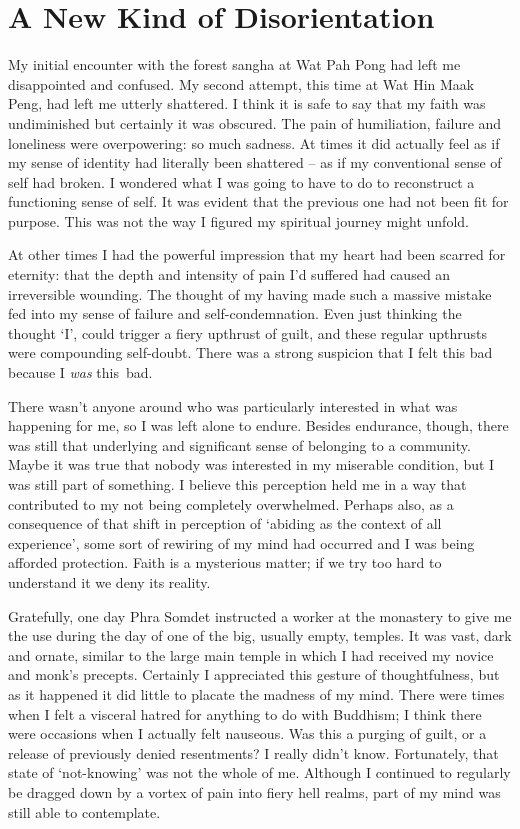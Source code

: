\chapter{A New Kind of Disorientation}

My initial encounter with the forest sangha at Wat Pah Pong had left me
disappointed and confused. My second attempt, this time at Wat Hin Maak Peng, had left me utterly shattered. I think it is safe to say that my faith was undiminished but
certainly it was obscured. The pain of humiliation, failure and
loneliness were overpowering: so much sadness. At times it did actually
feel as if my sense of identity had literally been shattered -- as if my
conventional sense of self had broken. I wondered what I was going to
have to do to reconstruct a functioning sense of self. It was evident
that the previous one had not been fit for purpose. This was not the way
I figured my spiritual journey might unfold.

\enlargethispage*{2\baselineskip}

At other times I had the powerful impression that my heart had been
scarred for eternity: that the depth and intensity of pain I'd suffered
had caused an irreversible wounding. The thought of my having made such
a massive mistake fed into my sense of failure and self-condemnation.
Even just thinking the thought `I', could trigger a fiery upthrust of
guilt, and these regular upthrusts were compounding \mbox{self-doubt}. There
was a strong suspicion that I felt this bad because I \emph{was} this~bad.

There wasn't anyone around who was particularly interested in what was
happening for me, so I was left alone to endure. Besides endurance,
though, there was still that underlying and significant sense of
belonging to a community. Maybe it was true that nobody was interested
in my miserable condition, but I was still part of something. I believe
this perception held me in a way that contributed to my not being
completely overwhelmed. Perhaps also, as a consequence of that shift in
perception of `abiding as the context of all experience', some sort of
rewiring of my mind had occurred and I was being afforded protection.
Faith is a mysterious matter; if we try too hard to understand it we
deny its reality.

Gratefully, one day Phra Somdet instructed a worker at the monastery to
give me the use during the day of one of the big, usually empty,
temples. It was vast, dark and ornate, similar to the large main temple
in which I had received my novice and monk's precepts. Certainly I
appreciated this gesture of thoughtfulness, but as it happened it did
little to placate the madness of my mind. There were times when I felt a
visceral hatred for anything to do with Buddhism; I think there were
occasions when I actually felt nauseous. Was this a purging of guilt, or
a release of previously denied resentments? I really didn't know.
Fortunately, that state of `not-knowing' was not the whole of me.
Although I continued to regularly be dragged down by a vortex of pain
into fiery hell realms, part of my mind was still able to contemplate.

